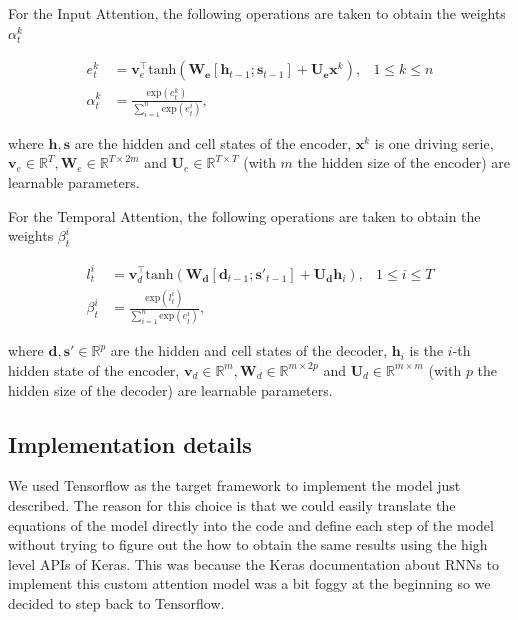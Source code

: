 \documentclass{article}
\begin{document}
For the Input Attention, the following operations are taken to
obtain the weights $\alpha_t^k$

\begin{align*}
e_t^k &= \mathbf{v}_e^\top\text{tanh}(
		 \mathbf{W_e}[\mathbf{h}_{t-1};\mathbf{s}_{t-1}] +\mathbf{U_e}\mathbf{x}^k), & 1 \le k \le n \\
\alpha_t^k &= \frac{\text{exp}(e_t^k)}{\sum_{i=1}^n \text{exp}(e_t^i)}, 
\end{align*}

where $\mathbf{h}, \mathbf{s}$ are the hidden and cell states 
of the encoder, $\mathbf{x}^k$ is one driving serie, 
$\mathbf{v}_e \in \mathbb{R}^T, \mathbf{W}_e \in \mathbb{R}^{T\times 2m}$ and 
$\mathbf{U}_e \in \mathbb{R}^{T\times T}$ (with $m$ the hidden size of the encoder)
are learnable parameters.

For the Temporal Attention, the following operations are taken to
obtain the weights $\beta_t^i$

\begin{align*}
l_t^i &= \mathbf{v}_d^\top\text{tanh}(
		 \mathbf{W_d}[\mathbf{d}_{t-1};\mathbf{s}'_{t-1}] +\mathbf{U_d}\mathbf{h}_i), & 1 \le i \le T \\
\beta_t^i &= \frac{\text{exp}(l_t^i)}{\sum_{i=1}^n \text{exp}(e_t^i)}, 
\end{align*}

where $\mathbf{d}, \mathbf{s}' \in \mathbb{R}^p$ are the hidden and cell states 
of the decoder, $\mathbf{h}_i$ is the $i$-th hidden state of the encoder, 
$\mathbf{v}_d \in \mathbb{R}^m, \mathbf{W}_d \in \mathbb{R}^{m \times 2p}$ and 
$\mathbf{U}_d \in \mathbb{R}^{m\times m}$ (with $p$ the hidden size of the decoder)
are learnable parameters.






\subsection{Implementation details}

We used Tensorflow as the target framework to implement the model just
described. The reason for this choice is that we
could easily translate the equations of the model directly into the code and
define each step of the model without
trying to figure out the how to obtain the same results using the high level
APIs of Keras. This was because the
Keras documentation about RNNs to implement this custom attention model was a
bit foggy at the beginning so we decided
to step back to Tensorflow. 
\end{document}
